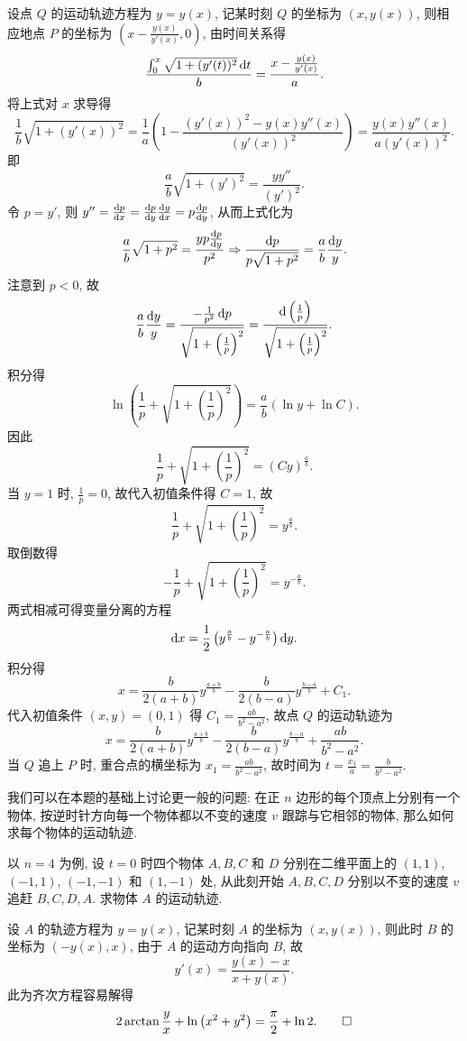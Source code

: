 \begin{solve}
  设点 $Q$ 的运动轨迹方程为 $y=y(x)$, 记某时刻 $Q$ 的坐标为 $(x,y(x))$,
  则相应地点 $P$ 的坐标为 $\left(x-\frac{y(x)}{y'(x)},0\right)$, 由时间关系得
  \[\frac{\int_0^x\sqrt{1+(y'(t))^2}\mathop{}\!\mathrm{d} t}{b}=\frac{x-\frac{y(x)}{y'(x)}}{a}.\]
  将上式对 $x$ 求导得
  \[\frac{1}{b}\sqrt{1+(y'(x))^2}=\frac{1}{a}\left(1-\frac{(y'(x))^2-y(x)y''(x)}{(y'(x))^2}\right)
    = \frac{y(x)y''(x)}{a(y'(x))^2}.\]
  即
  \[\frac{a}{b}\sqrt{1+(y')^2}=\frac{yy''}{(y')^2}.\]
  令 $p=y'$, 则 $y''=\frac{\diff p}{\diff x}=\frac{\diff p}{\diff y}\frac{\diff y}{\diff x}=p\frac{\diff p}{\diff y}$,
  从而上式化为
  \[\frac{a}{b}\sqrt{1+p^2}=\frac{yp\frac{\mathop{}\!\mathrm{d} p}{\mathop{}\!\mathrm{d} y}}{p^2}
    \Rightarrow\frac{\mathop{}\!\mathrm{d} p}{p\sqrt{1+p^2}}=\frac{a}{b}\frac{\mathop{}\!\mathrm{d} y}{y}.\]
  注意到 $p<0$, 故
  \[\frac{a}{b}\frac{\mathop{}\!\mathrm{d} y}{y}=\frac{-\frac{1}{p^2}\mathop{}\!\mathrm{d} p}{\sqrt{1+\left(\frac{1}{p}\right)^2}}
    = \frac{\mathop{}\!\mathrm{d}\left(\frac{1}{p}\right)}{\sqrt{1+\left(\frac{1}{p}\right)^2}}.\]
  积分得
  \[\ln\left(\frac{1}{p}+\sqrt{1+\left(\frac{1}{p}\right)^2}\right)=\frac{a}{b}(\ln y+\ln C).\]
  因此
  \[\frac{1}{p}+\sqrt{1+\left(\frac{1}{p}\right)^2}=(Cy)^{\frac{a}{b}}.\]
  当 $y=1$ 时, $\frac{1}{p}=0$, 故代入初值条件得 $C=1$, 故
  \[\frac{1}{p}+\sqrt{1+\left(\frac{1}{p}\right)^2}=y^{\frac{a}{b}}.\]
  取倒数得
  \[-\frac{1}{p}+\sqrt{1+\left(\frac{1}{p}\right)^2}=y^{-\frac{a}{b}}.\]
  两式相减可得变量分离的方程
  \[\mathop{}\!\mathrm{d} x=\frac{1}{2}\left(y^{\frac{a}{b}}-y^{-\frac{a}{b}}\right)\mathop{}\!\mathrm{d} y.\]
  积分得
  \[x=\frac{b}{2(a+b)}y^{\frac{a+b}{b}}-\frac{b}{2(b-a)}y^{\frac{b-a}{b}}+C_1.\]
  代入初值条件 $(x,y)=(0,1)$ 得 $C_1=\frac{ab}{b^2-a^2}$, 故点 $Q$ 的运动轨迹为
  \[x=\frac{b}{2(a+b)}y^{\frac{a+b}{b}}-\frac{b}{2(b-a)}y^{\frac{b-a}{b}}+\frac{ab}{b^2-a^2}.\]
  当 $Q$ 追上 $P$ 时, 重合点的横坐标为 $x_1=\frac{ab}{b^2-a^2}$,
  故时间为 $t=\frac{x_1}{a}=\frac{b}{b^2-a^2}$.
\end{solve}
我们可以在本题的基础上讨论更一般的问题: 在正 $n$ 边形的每个顶点上分别有一个物体,
按逆时针方向每一个物体都以不变的速度 $v$ 跟踪与它相邻的物体, 那么如何求每个物体的运动轨迹.

以 $n=4$ 为例, 设 $t=0$ 时四个物体 $A,B,C$ 和 $D$ 分别在二维平面上的
$(1,1)$, $(-1,1)$, $(-1,-1)$ 和 $(1,-1)$ 处,
从此刻开始 $A,B,C,D$ 分别以不变的速度 $v$ 追赶 $B,C,D,A$. 求物体 $A$ 的运动轨迹.
\begin{solve}
  设 $A$ 的轨迹方程为 $y=y(x)$, 记某时刻 $A$ 的坐标为 $(x,y(x))$,
  则此时 $B$ 的坐标为 $(-y(x),x)$, 由于 $A$ 的运动方向指向 $B$, 故
  \[y'(x)=\frac{y(x)-x}{x+y(x)}.\]
  此为齐次方程容易解得
  \[2\arctan\frac{y}{x}+\ln\left(x^2+y^2\right)=\frac{\pi}{2}+\ln 2.\qedhere\]
\end{solve}



